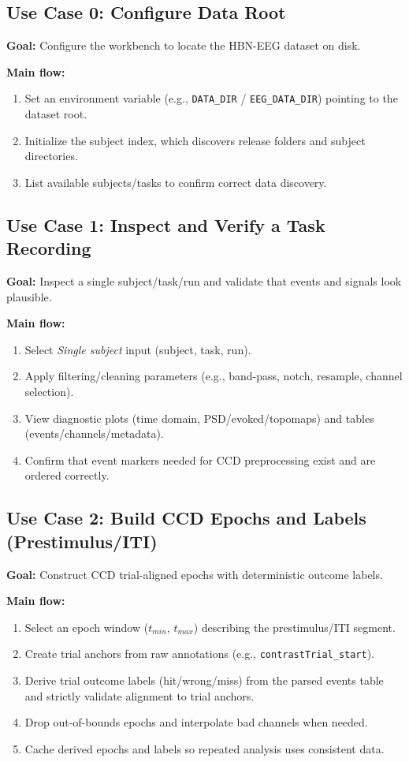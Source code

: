 \subsection{Use Case 0: Configure Data Root}
\label{subsec:uc-configure}
\textbf{Goal:} Configure the workbench to locate the HBN-EEG dataset on disk.

\textbf{Main flow:}
\begin{enumerate}
    \item Set an environment variable (e.g., \texttt{DATA\_DIR} / \texttt{EEG\_DATA\_DIR}) pointing to the dataset root.
    \item Initialize the subject index, which discovers release folders and subject directories.
    \item List available subjects/tasks to confirm correct data discovery.
\end{enumerate}

\subsection{Use Case 1: Inspect and Verify a Task Recording}
\label{subsec:uc-inspect}
\textbf{Goal:} Inspect a single subject/task/run and validate that events and signals look plausible.

\textbf{Main flow:}
\begin{enumerate}
    \item Select \textit{Single subject} input (subject, task, run).
    \item Apply filtering/cleaning parameters (e.g., band-pass, notch, resample, channel selection).
    \item View diagnostic plots (time domain, PSD/evoked/topomaps) and tables (events/channels/metadata).
    \item Confirm that event markers needed for CCD preprocessing exist and are ordered correctly.
\end{enumerate}

\subsection{Use Case 2: Build CCD Epochs and Labels (Prestimulus/ITI)}
\label{subsec:uc-epochs}
\textbf{Goal:} Construct CCD trial-aligned epochs with deterministic outcome labels.

\textbf{Main flow:}
\begin{enumerate}
    \item Select an epoch window ($t_{min}$, $t_{max}$) describing the prestimulus/ITI segment.
    \item Create trial anchors from raw annotations (e.g., \texttt{contrastTrial\_start}).
    \item Derive trial outcome labels (hit/wrong/miss) from the parsed events table and strictly validate alignment to trial anchors.
    \item Drop out-of-bounds epochs and interpolate bad channels when needed.
    \item Cache derived epochs and labels so repeated analysis uses consistent data.
\end{enumerate}

